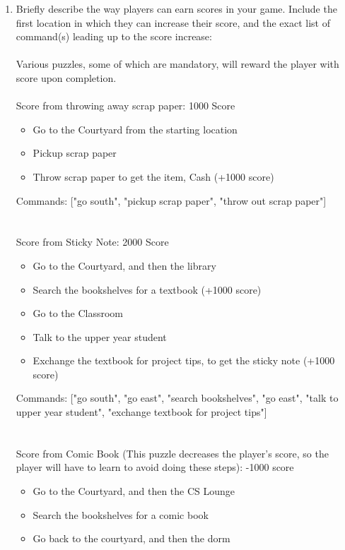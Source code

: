 \documentclass[11pt]{article}
\begin{document}
\begin{enumerate}
    \item Briefly describe the way players can earn scores in your game. Include the first location in which they can increase their score, and the exact list of command(s) leading up to the score increase:\\\\
Various puzzles, some of which are mandatory, will reward the player with score upon completion. \\\\
Score from throwing away scrap paper: 1000 Score
        \begin{itemize}
            \item Go to the Courtyard from the starting location
            \item Pickup scrap paper
            \item Throw scrap paper to get the item, Cash (+1000 score)
        \end{itemize}
Commands: ["go south", "pickup scrap paper", "throw out scrap paper"]
\\\\\\
Score from Sticky Note: 2000 Score
        \begin{itemize}
            \item Go to the Courtyard, and then the library
            \item Search the bookshelves for a textbook (+1000 score)
            \item Go to the Classroom
            \item Talk to the upper year student
            \item Exchange the textbook for project tips, to get the sticky note (+1000 score)
        \end{itemize}
Commands: ["go south", "go east", "search bookshelves", "go east", "talk to upper year student", "exchange textbook for project tips"]
\\\\\\
Score from Comic Book (This puzzle decreases the player's score, so the player will have to learn to avoid doing these steps): -1000 score
        \begin{itemize}
            \item Go to the Courtyard, and then the CS Lounge
            \item Search the bookshelves for a comic book
            \item Go back to the courtyard, and then the dorm

\end{itemize}
\end{enumerate}
\end{document}
